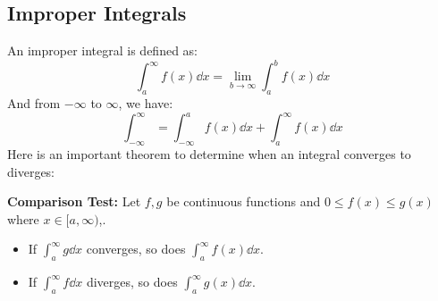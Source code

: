 \documentclass{article}
\begin{document}
    \subsection{Improper Integrals}
    An improper integral is defined as:
    \begin{equation}
        \int_a^\infty f(x) \dd{x} = \lim_{b\to\infty} \int_a^b f(x) \dd{x}
    \end{equation}
    And from $-\infty$ to $\infty$, we have:
    \begin{equation}
        \int_{-\infty}^{\infty} = \int_{-\infty}^a f(x) \dd{x} + \int_a^\infty f(x) \dd{x}
    \end{equation}
    Here is an important theorem to determine when an integral converges to diverges:
    \begin{theorem}
        \textbf{Comparison Test:} Let $f,g$ be continuous functions and $0 \le f(x) \le g(x)$ where $x\in [a,\infty)$,. 
        \begin{itemize}
            \item If $\int_a^\infty g \dd{x}$ converges, so does $\int_a^\infty f(x) \dd{x}$.
            \item If $\int_a^\infty f \dd{x}$ diverges, so does $\int_a^\infty g(x) \dd{x}$.
        \end{itemize}
    \end{theorem}
\end{document}
